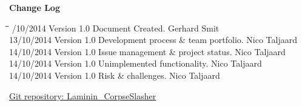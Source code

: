 \documentclass[letterpaper]{article}
\begin{document}
	\newpage
	{\LARGE \bf Change Log}\\[2em]
	
	\begin{tabbing}
		\hspace*{2.5cm}\=\hspace*{2.5cm}\=\hspace*{8cm}\=\hspace*{3cm} /10/2014	\> Version 1.0	\> Document Created.							\> Gerhard Smit \\
		13/10/2014	\> Version 1.0	\> Development process \& team portfolio. 		\> Nico Taljaard \\
		14/10/2014	\> Version 1.0	\> Issue management \& project status.			\> Nico Taljaard \\
		14/10/2014	\> Version 1.0	\> Unimplemented functionality.					\> Nico Taljaard \\
		14/10/2014	\> Version 1.0	\> Risk \& challenges. 							\> Nico Taljaard \\
		
		
	\end{tabbing}
	
		\newpage
		\renewcommand\contentsname{TABLE OF CONTENTS}
		\newcommand\contentsnameLC{\colorbox{black}{\makebox[\textwidth-2\fboxsep][l]{\bfseries\color{red} Table of Contents}}}
		
		\renewcommand{\cftdot}{}
		\hypersetup{linktocpage}
		\tableofcontents
		
		\begin{flushleft}
			\LARGE\href{https://github.com/njTaljaard/Laminin_CorpseSlasher/}{Git repository: Laminin\_CorpseSlasher}
		\end{flushleft}
		
	\newpage
	\section*{\colorbox{black}{}} 
		\vspace{0.1in}
		
\end{document}
